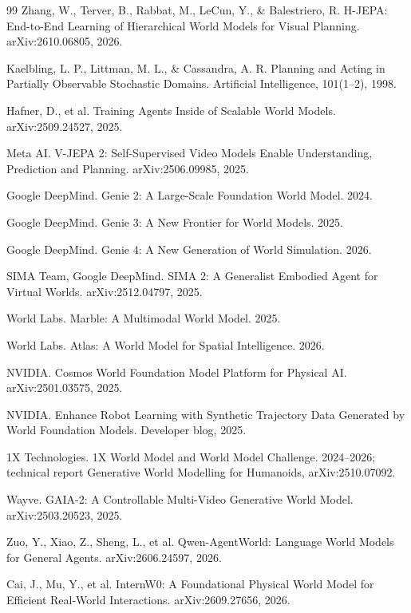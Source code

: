 \documentclass[10pt]{article}
\begin{document}
\begin{thebibliography}{99}
Zhang, W., Terver, B., Rabbat, M., LeCun, Y., \& Balestriero, R. H-JEPA: End-to-End Learning of Hierarchical World Models for Visual Planning. arXiv:2610.06805, 2026.

Kaelbling, L. P., Littman, M. L., \& Cassandra, A. R. Planning and Acting in Partially Observable Stochastic Domains. Artificial Intelligence, 101(1--2), 1998.

Hafner, D., et al. Training Agents Inside of Scalable World Models. arXiv:2509.24527, 2025.

Meta AI. V-JEPA 2: Self-Supervised Video Models Enable Understanding, Prediction and Planning. arXiv:2506.09985, 2025.

Google DeepMind. Genie 2: A Large-Scale Foundation World Model. 2024.

Google DeepMind. Genie 3: A New Frontier for World Models. 2025.

Google DeepMind. Genie 4: A New Generation of World Simulation. 2026.

SIMA Team, Google DeepMind. SIMA 2: A Generalist Embodied Agent for Virtual Worlds. arXiv:2512.04797, 2025.

World Labs. Marble: A Multimodal World Model. 2025.

World Labs. Atlas: A World Model for Spatial Intelligence. 2026.

NVIDIA. Cosmos World Foundation Model Platform for Physical AI. arXiv:2501.03575, 2025.

NVIDIA. Enhance Robot Learning with Synthetic Trajectory Data Generated by World Foundation Models. Developer blog, 2025.

1X Technologies. 1X World Model and World Model Challenge. 2024--2026; technical report Generative World Modelling for Humanoids, arXiv:2510.07092.

Wayve. GAIA-2: A Controllable Multi-Video Generative World Model. arXiv:2503.20523, 2025.

Zuo, Y., Xiao, Z., Sheng, L., et al. Qwen-AgentWorld: Language World Models for General Agents. arXiv:2606.24597, 2026.

Cai, J., Mu, Y., et al. InternW0: A Foundational Physical World Model for Efficient Real-World Interactions. arXiv:2609.27656, 2026.


\end{thebibliography}
\end{document}

